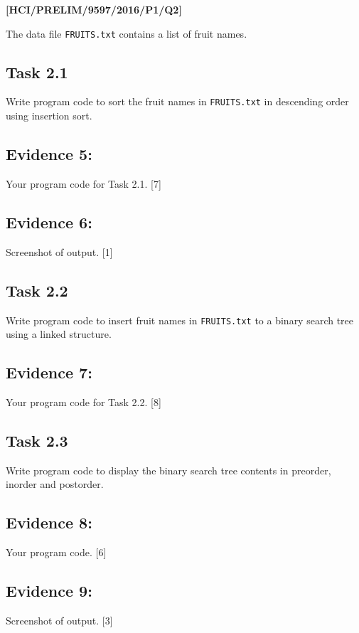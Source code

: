 \item \textbf{{[}HCI/PRELIM/9597/2016/P1/Q2{]} }

The data file \texttt{FRUITS.txt} contains a list of fruit names. 

\subsection*{Task 2.1 }

Write program code to sort the fruit names in \texttt{FRUITS.txt}
in descending order using insertion sort. 

\subsection*{Evidence 5: }

Your program code for Task 2.1. \hfill{}{[}7{]}

\subsection*{Evidence 6: }

Screenshot of output. \hfill{}{[}1{]}

\subsection*{Task 2.2 }

Write program code to insert fruit names in \texttt{FRUITS.txt} to
a binary search tree using a linked structure.

\subsection*{Evidence 7:}

Your program code for Task 2.2. \hfill{}{[}8{]}

\subsection*{Task 2.3 }

Write program code to display the binary search tree contents in preorder,
inorder and postorder. 

\subsection*{Evidence 8: }

Your program code.\hfill{} {[}6{]}

\subsection*{Evidence 9: }

Screenshot of output.\hfill{} {[}3{]}
